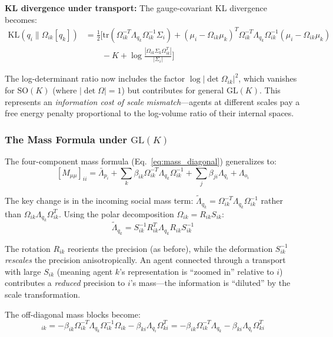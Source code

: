 \documentclass[11pt]{article}
\begin{document}
\textbf{KL divergence under transport:} The gauge-covariant KL divergence becomes:
\begin{align}
\mathrm{KL}(q_i \| \Omega_{ik}[q_k]) &= \frac{1}{2}\Big[\mathrm{tr}(\Omega_{ik}^{-T}\Lambda_{q_k}\Omega_{ik}^{-1}\Sigma_i) + (\mu_i - \Omega_{ik}\mu_k)^T\Omega_{ik}^{-T}\Lambda_{q_k}\Omega_{ik}^{-1}(\mu_i - \Omega_{ik}\mu_k) \nonumber \\
&\qquad - K + \log\frac{|\Omega_{ik}\Sigma_k\Omega_{ik}^T|}{|\Sigma_i|}\Big]
\end{align}

The log-determinant ratio now includes the factor $\log|\det\Omega_{ik}|^2$, which vanishes for $\mathrm{SO}(K)$ (where $|\det\Omega| = 1$) but contributes for general $\mathrm{GL}(K)$. This represents an \emph{information cost of scale mismatch}---agents at different scales pay a free energy penalty proportional to the log-volume ratio of their internal spaces.

\subsubsection{The Mass Formula under $\mathrm{GL}(K)$}

The four-component mass formula (Eq.~\ref{eq:mass_diagonal}) generalizes to:
\begin{equation}
\boxed{[M_{\mu\mu}]_{ii} = \bar{\Lambda}_{p_i} + \sum_k \beta_{ik}\Omega_{ik}^{-T}\Lambda_{q_k}\Omega_{ik}^{-1} + \sum_j \beta_{ji}\Lambda_{q_i} + \Lambda_{o_i}}
\end{equation}

The key change is in the incoming social mass term: $\tilde{\Lambda}_{q_k} = \Omega_{ik}^{-T}\Lambda_{q_k}\Omega_{ik}^{-1}$ rather than $\Omega_{ik}\Lambda_{q_k}\Omega_{ik}^T$. Using the polar decomposition $\Omega_{ik} = R_{ik} S_{ik}$:
\begin{equation}
\tilde{\Lambda}_{q_k} = S_{ik}^{-1} R_{ik}^T \Lambda_{q_k} R_{ik} S_{ik}^{-1}
\end{equation}

The rotation $R_{ik}$ reorients the precision (as before), while the deformation $S_{ik}^{-1}$ \emph{rescales} the precision anisotropically. An agent connected through a transport with large $S_{ik}$ (meaning agent $k$'s representation is ``zoomed in'' relative to $i$) contributes a \emph{reduced} precision to $i$'s mass---the information is ``diluted'' by the scale transformation.

The off-diagonal mass blocks become:
\begin{equation}
[M_{\mu\mu}]_{ik} = -\beta_{ik}\Omega_{ik}^{-T}\Lambda_{q_k}\Omega_{ik}^{-1}\Omega_{ik} - \beta_{ki}\Lambda_{q_i}\Omega_{ki}^T = -\beta_{ik}\Omega_{ik}^{-T}\Lambda_{q_k} - \beta_{ki}\Lambda_{q_i}\Omega_{ki}^T
\end{equation}
\end{document}
